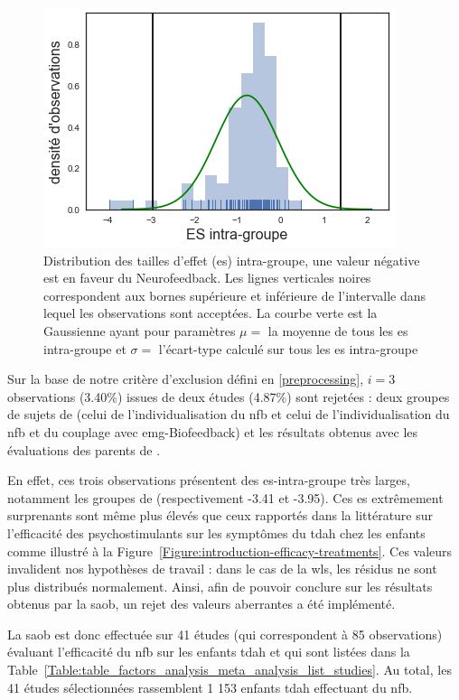 \begin{figure}[h!]
  \centering
	\includegraphics[width=0.7\linewidth]{figures/chapter-3/distribution-ES-within} 
  \caption{Distribution des tailles d'effet (\gls{es}) intra-groupe, une valeur négative est en faveur du Neurofeedback. Les lignes 
	verticales noires correspondent aux bornes supérieure et 
	inférieure de l'intervalle dans lequel les observations sont acceptées. La courbe verte est la Gaussienne ayant pour paramètres $\mu =$ la moyenne
	de tous les \gls{es} intra-groupe et $\sigma =$ l'écart-type calculé sur tous les \gls{es} intra-groupe}
  \label{Figure:distribution_ES_within}
\end{figure}

Sur la base de notre critère d'exclusion défini en \ref{preprocessing}, $i = 3$ observations (3.40\%) issues de deux études (4.87\%) sont rejetées : deux groupes de sujets de 
\citet{Bazanova2018} (celui de l'individualisation du \gls{nfb} et 
celui de l'individualisation du \gls{nfb} et du couplage avec \gls{emg}-Biofeedback) et les résultats obtenus avec les évaluations des 
parents de \citet{Rajabi2019}. 

En effet, ces trois observations présentent des \gls{es}-intra-groupe très larges, notamment les groupes de \citet{Bazanova2018} 
(respectivement -3.41 et -3.95). Ces \gls{es} extrêmement surprenants sont même plus élevés que ceux rapportés dans la littérature sur l'efficacité 
des psychostimulants sur les symptômes du \gls{tdah} chez les enfants \citep{Luan2017} comme illustré à la Figure~\ref{Figure:introduction-efficacy-treatments}. 
Ces valeurs invalident nos hypothèses de travail : dans le cas de la 
\gls{wls}, les résidus ne sont plus distribués normalement. Ainsi, afin de pouvoir conclure sur les résultats obtenus par la \gls{saob}, 
un rejet des valeurs aberrantes a été implémenté.

La \gls{saob} est donc effectuée sur 41 études (qui correspondent à 85 observations) évaluant l'efficacité du \gls{nfb} sur les enfants \gls{tdah} et 
qui sont listées dans la Table~\ref{Table:table_factors_analysis_meta_analysis_list_studies}. Au total, les 41 études sélectionnées rassemblent 
1 153 enfants \gls{tdah} effectuant du \gls{nfb}.

